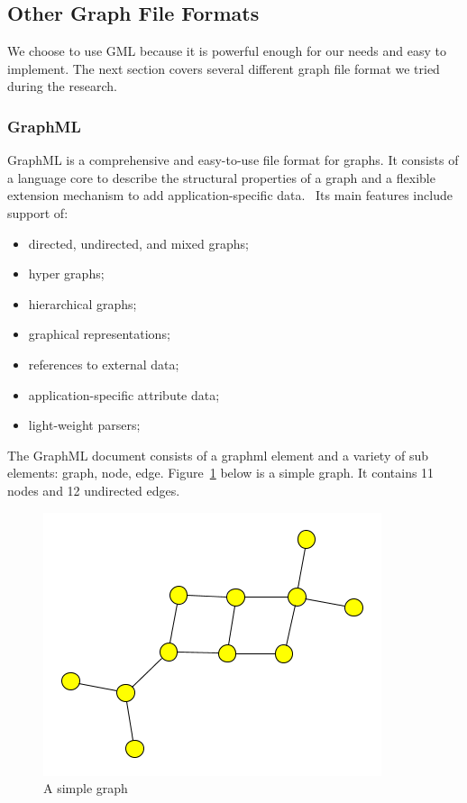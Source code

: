 \subsection{Other Graph File Formats}

We choose to use GML because it is powerful enough for our needs and easy to implement. The next section covers several different graph file format we tried during the research.

\subsubsection{GraphML}
GraphML is a comprehensive and easy-to-use file format for graphs. It consists of a language core to describe the structural properties of a graph and a flexible extension mechanism to add application-specific data.~\cite{GraphML} Its main features include support of:
\begin{itemize}
\item directed, undirected, and mixed graphs;
\item hyper graphs;
\item hierarchical graphs;
\item graphical representations;
\item references to external data;
\item application-specific attribute data;
\item light-weight parsers;
\end{itemize}

The GraphML document consists of a graphml element and a variety of sub elements: graph, node, edge. Figure~\ref{fig:simple_graphml} below is a simple graph. It contains 11 nodes and 12 undirected edges.

\begin{figure}[h!]
\centering
\includegraphics[scale=1.0]{pictures/simple.png}
\caption{A simple graph}
\label{fig:simple_graphml}
\end{figure}


